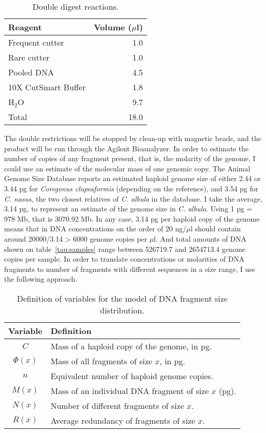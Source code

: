 \documentclass[a4paper,12pt,twosided]{article}
\begin{document}
\begin{table}
\begin{center}
\caption{Double digest reactions.}
\vspace*{0.2cm}
\begin{tabular}{lr}
\toprule
Reagent&Volume ($\mu$l)\\
\midrule
Frequent cutter&1.0\\
Rare cutter&1.0\\
Pooled DNA&4.5\\
10X CutSmart Buffer&1.8\\
H$_2$O&9.7\\
\midrule
Total&18.0\\
\bottomrule
\end{tabular}
\end{center}
\end{table}

The double restrictions will be stopped by clean-up with magnetic beads, and the product will be run through the Agilent Bioanalyzer. In order to estimate the number of copies of any fragment present, that is, the molarity of the genome, I could use an estimate of the molecular mass of one genomic copy. The Animal Genome Size Database reports an estimated haploid genome size of either 2.44 or 3.44 pg for \emph{Coregonus clupeaformis} (depending on the reference), and 3.54 pg for \emph{C. nasus}, the two closest relatives of \emph{C. albula} in the database. I take the average, 3.14 pg, to represent an estimate of the genome size in \emph{C. albula}. Using 1 pg = 978 Mb, that is 3070.92 Mb. In any case, 3.14 pg per haploid copy of the genome means that in DNA concentrations on the order of 20 ng/$\mu$l should contain around 20000/3.14 > 6000 genome copies per $\mu$l. And total amounts of DNA shown on table~\ref{tau:samples} range between 526719.7 and 2654713.4 genome copies per sample. In order to translate concentrations or molarities of DNA fragments to number of fragments with different sequences in a size range, I use the following approach.

\begin{table}
\begin{center}
\caption{Definition of variables for the model of DNA fragment size distribution.}\label{tau:model}
\vspace*{0.2cm}
\begin{tabular}{cl}
\toprule
Variable&Definition\\
\midrule
$C$&Mass of a haploid copy of the genome, in pg.\\
$\Phi(x)$&Mass of all fragments of size $x$, in pg.\\
$n$&Equivalent number of haploid genome copies.\\
$M(x)$&Mass of an individual DNA fragment of size $x$ (pg).\\
$N(x)$&Number of different fragments of size $x$.\\
$R(x)$&Average redundancy of fragments of size $x$.\\
\bottomrule
\end{tabular}
\end{center}
\end{table}
\end{document}
